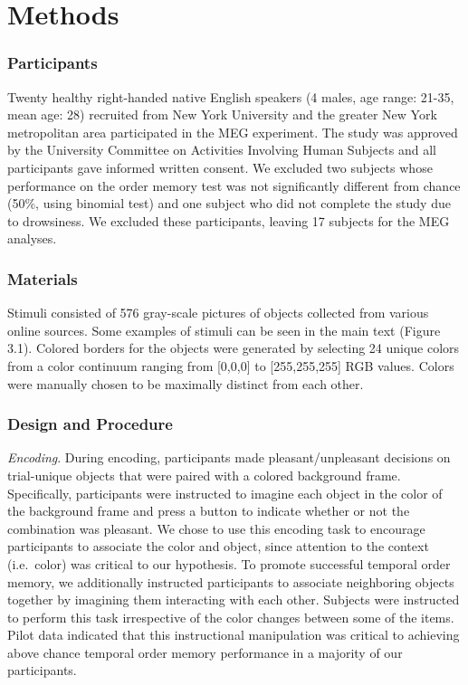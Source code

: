 \section{Methods}\label{methods}

\subsubsection{Participants}\label{participants}

Twenty healthy right-handed native English speakers (4 males, age range:
21-35, mean age: 28) recruited from New York University and the greater
New York metropolitan area participated in the MEG experiment. The study
was approved by the University Committee on Activities Involving Human
Subjects and all participants gave informed written consent. We excluded
two subjects whose performance on the order memory test was not
significantly different from chance (50\%, using binomial test) and one
subject who did not complete the study due to drowsiness. We excluded
these participants, leaving 17 subjects for the MEG analyses.

\subsubsection{Materials}\label{materials}

Stimuli consisted of 576 gray-scale pictures of objects collected from
various online sources. Some examples of stimuli can be seen in the main
text (Figure 3.1). Colored borders for the objects were generated by
selecting 24 unique colors from a color continuum ranging from
{[}0,0,0{]} to {[}255,255,255{]} RGB values. Colors were manually chosen
to be maximally distinct from each other.

\subsubsection{Design and Procedure}\label{design-and-procedure}

\emph{Encoding}. During encoding, participants made pleasant/unpleasant
decisions on trial-unique objects that were paired with a colored
background frame. Specifically, participants were instructed to imagine
each object in the color of the background frame and press a button to
indicate whether or not the combination was pleasant. We chose to use
this encoding task to encourage participants to associate the color and
object, since attention to the context (i.e.~color) was critical to our
hypothesis. To promote successful temporal order memory, we additionally
instructed participants to associate neighboring objects together by
imagining them interacting with each other. Subjects were instructed to
perform this task irrespective of the color changes between some of the
items. Pilot data indicated that this instructional manipulation was
critical to achieving above chance temporal order memory performance in
a majority of our participants.

